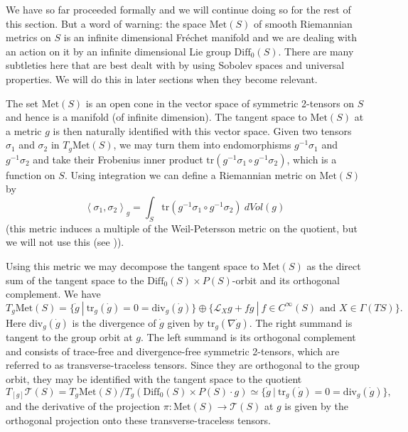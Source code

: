 \documentclass{amsart}
\begin{document}
We have so far proceeded formally and we will continue doing so for the rest of this section. 
But a word of warning: the space $\mathrm{Met}(S)$ of smooth Riemannian metrics on $S$ is an infinite dimensional Fr\'echet manifold and we are dealing with an action on it by an infinite dimensional Lie group $\mathrm{Diff}_0(S)$. 
There are many subtleties here that are best dealt with by using Sobolev spaces and universal properties. 
We will do this in later sections when they become relevant. 

The set $\mathrm{Met}(S)$ is an open cone in the vector space of symmetric 2-tensors on $S$ and hence is a manifold (of infinite dimension). 
The tangent space to $\mathrm{Met}(S)$ at a metric $g$ is then naturally identified with this vector space. 
Given two tensors $\sigma_1$ and $\sigma_2$ in $T_g \mathrm{Met}(S)$, we may turn them into endomorphisms $g^{-1}\sigma_1$ and $g^{-1}\sigma_2$ and take their Frobenius inner product $\mathrm{tr}( g^{-1}\sigma_1 \circ g^{-1}\sigma_2)$, which is a function on $S$. 
Using integration we can define a Riemannian metric on $\mathrm{Met}(S)$ by 
\[
\left< \sigma_1, \sigma_2 \right>_g = \int_S \mathrm{tr}( g^{-1}\sigma_1 \circ g^{-1}\sigma_2) \ dVol(g)
\]
(this metric induces a multiple of the Weil-Petersson metric on the quotient, but we will not use this (see \cite{tromba1992})).

Using this metric we may decompose the tangent space to $\mathrm{Met}(S)$ as the direct sum of the tangent space to the $\mathrm{Diff}_0(S) \times P(S)$-orbit and its orthogonal complement. 
We have
\[
T_g \mathrm{Met}(S) = \{ \dot{g} \ | \ \mathrm{tr}_g(\dot{g}) = 0 = \mathrm{div}_g(\dot{g})\} \oplus \{ \mathcal{L}_X g + fg \ | \ f \in C^\infty(S) \text{ and } X \in \Gamma(TS) \}.
\]
Here $\mathrm{div}_g(\dot{g})$ is the divergence of $\dot{g}$ given by $\mathrm{tr}_g(\nabla \dot{g})$. 
The right summand is tangent to the group orbit at $g$. 
The left summand is its orthogonal complement and consists of trace-free and divergence-free symmetric 2-tensors, which are referred to as transverse-traceless tensors. 
Since they are orthogonal to the group orbit, they may be identified with the tangent space to the quotient
\[
T_{[g]} \mathcal{T}(S) = T_g \mathrm{Met}(S)/T_g(\mathrm{Diff}_0(S) \times P(S) \cdot g) \simeq \{ \dot{g} \ | \ \mathrm{tr}_g(\dot{g}) = 0 = \mathrm{div}_g(\dot{g})\},
\]
and the derivative of the projection $\pi: \mathrm{Met}(S) \to \mathcal{T}(S)$ at $g$ is given by the orthogonal projection onto these transverse-traceless tensors. 
\end{document}
